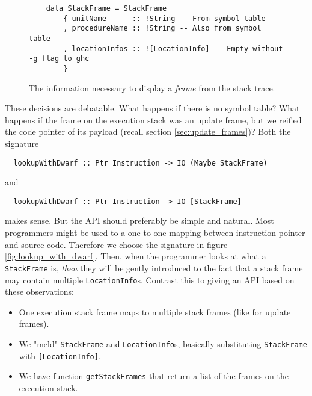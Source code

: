 \begin{figure}
\begin{mdframed}
  \begin{verbatim}
    data StackFrame = StackFrame
        { unitName      :: !String -- From symbol table
        , procedureName :: !String -- Also from symbol table
        , locationInfos :: ![LocationInfo] -- Empty without -g flag to ghc
        }
  \end{verbatim}
  \caption{The information necessary to display a \emph{frame} from the stack
    trace.}
  \label{fig:stack_frame}
\end{mdframed}
\end{figure}

These decisions are debatable. What happens if there is no symbol
table? What happens if the frame on the execution stack was an update
frame, but we reified the code pointer of its payload (recall section
\ref{sec:update_frames})? Both the signature

\begin{verbatim}
  lookupWithDwarf :: Ptr Instruction -> IO (Maybe StackFrame)
\end{verbatim}

and

\begin{verbatim}
  lookupWithDwarf :: Ptr Instruction -> IO [StackFrame]
\end{verbatim}

makes sense. But the API should preferably be simple and natural. Most
programmers might be used to a one to one mapping between instruction pointer
and source code. Therefore we choose the signature in figure
\ref{fig:lookup_with_dwarf}. Then, when the programmer looks at what a
\texttt{StackFrame} is, \emph{then} they will be gently introduced to
the fact that a stack frame may contain multiple \texttt{LocationInfo}s.
Contrast this to giving an API based on these observations:

\begin{itemize}
  \item
    One execution stack frame maps to multiple stack frames (like for
    update frames).
  \item
    We "meld" \texttt{StackFrame} and \texttt{LocationInfo}s, basically
    substituting \texttt{StackFrame} with \texttt{[LocationInfo]}.
  \item
    We have function \texttt{getStackFrames} that return a list of the
    frames on the execution stack.
\end{itemize}

